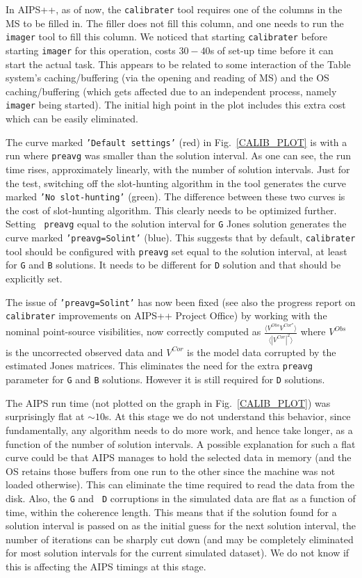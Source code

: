 In AIPS++, as of now, the {\tt calibrater} tool requires one of the
columns in the MS to be filled in.  The filler does not fill this
column, and one needs to run the {\tt imager} tool to fill this
column.  We noticed that starting {\tt calibrater} before starting
{\tt imager} for this operation, costs $30-40$s of set-up time before
it can start the actual task.  This appears to be related to some
interaction of the Table system's caching/buffering (via the opening
and reading of MS) and the OS caching/buffering (which gets affected
due to an independent process, namely {\tt imager} being started).
The initial high point in the plot includes this extra cost which can
be easily eliminated.

The curve marked {\tt 'Default settings'} (red) in
Fig.~\ref{CALIB_PLOT} is with a run where {\tt preavg} was smaller
than the solution interval.  As one can see, the run time rises,
approximately linearly, with the number of solution intervals.  Just
for the test, switching off the slot-hunting algorithm in the tool
generates the curve marked {\tt'No slot-hunting'} (green).  The
difference between these two curves is the cost of slot-hunting
algorithm.  This clearly needs to be optimized further.  Setting {\tt
preavg} equal to the solution interval for {\tt G} Jones solution
generates the curve marked {\tt 'preavg=Solint'} (blue).  This
suggests that by default, {\tt calibrater} tool should be configured
with {\tt preavg} set equal to the solution interval, at least for
{\tt G} and {\tt B} solutions.  It needs to be different for {\tt D}
solution and that should be explicitly set.

The issue of {\tt 'preavg=Solint'} has now been fixed (see also the
progress report on {\tt calibrater} improvements on AIPS++ Project
Office) by working with the nominal point-source visibilities, now
correctly computed as $\frac{\langle V^{Obs} V^{{Cor}^\star}
\rangle}{\langle |V^{Cor}|^2
\rangle}$ where $V^{Obs}$ is the uncorrected observed data and
$V^{Cor}$ is the model data corrupted by the estimated Jones
matrices.  This eliminates the need for the extra
{\tt preavg} parameter for {\tt G} and {\tt B} solutions.  However it
is still required for {\tt D} solutions.

The AIPS run time (not plotted on the graph in Fig.~\ref{CALIB_PLOT})
was surprisingly flat at $\sim10$s.  At this stage we do not
understand this behavior, since fundamentally, any algorithm needs to
do more work, and hence take longer, as a function of the number of
solution intervals.  A possible explanation for such a flat curve
could be that AIPS manages to hold the selected data in memory (and
the OS retains those buffers from one run to the other since the
machine was not loaded otherwise).  This can eliminate the time
required to read the data from the disk.  Also, the {\tt G} and {\tt
D} corruptions in the simulated data are flat as a function of time,
within the coherence length.  This means that if the solution found
for a solution interval is passed on as the initial guess for the next
solution interval, the number of iterations can be sharply cut down
(and may be completely eliminated for most solution intervals for the
current simulated dataset).  We do not know if this is affecting the
AIPS timings at this stage.


